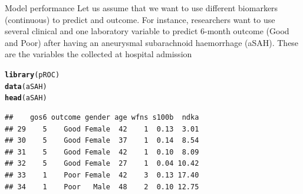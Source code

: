 \documentclass[10pt,xcolor=dvipsnames]{beamer}\usepackage[]{graphicx}\usepackage[]{color}
\makeatletter
\newcommand{\hlstd}[1]{\textcolor[rgb]{0.345,0.345,0.345}{#1}}%
\newcommand{\hlkwd}[1]{\textcolor[rgb]{0.737,0.353,0.396}{\textbf{#1}}}%
\newenvironment{kframe}{%
 \def\at@end@of@kframe{}%
 \ifinner\ifhmode%
  \def\at@end@of@kframe{\end{minipage}}%
  \begin{minipage}{\columnwidth}%
 \fi\fi%
 \def\FrameCommand##1{\hskip\@totalleftmargin \hskip-\fboxsep
 \colorbox{shadecolor}{##1}\hskip-\fboxsep
     \hskip-\linewidth \hskip-\@totalleftmargin \hskip\columnwidth}%
 \MakeFramed {\advance\hsize-\width
   \@totalleftmargin\z@ \linewidth\hsize
   \@setminipage}}%
 {\par\unskip\endMakeFramed%
 \at@end@of@kframe}
\newenvironment{knitrout}{}{} %
\makeatother
\begin{document}
\begin{frame}[fragile]{Model performance}
Let us assume that we want to use different biomarkers (continuous) to predict and outcome. For instance, researchers want to use several clinical and one laboratory variable to predict 6-month outcome (Good and Poor) after having an aneurysmal subarachnoid haemorrhage (aSAH). These are the variables the collected at hospital admission

\begin{knitrout}\footnotesize
{}\color{fgcolor}\begin{kframe}
\begin{alltt}
\hlkwd{library}\hlstd{(pROC)}
\hlkwd{data}\hlstd{(aSAH)}
\hlkwd{head}\hlstd{(aSAH)}
\end{alltt}
\begin{verbatim}
##    gos6 outcome gender age wfns s100b  ndka
## 29    5    Good Female  42    1  0.13  3.01
## 30    5    Good Female  37    1  0.14  8.54
## 31    5    Good Female  42    1  0.10  8.09
## 32    5    Good Female  27    1  0.04 10.42
## 33    1    Poor Female  42    3  0.13 17.40
## 34    1    Poor   Male  48    2  0.10 12.75
\end{verbatim}
\end{kframe}
\end{knitrout}

\end{frame}
\end{document}
